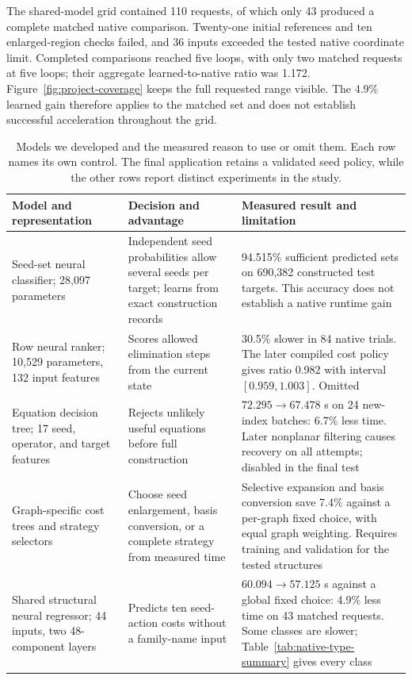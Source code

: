 The shared-model grid contained 110 requests, of which only 43 produced a complete matched native comparison. Twenty-one initial references and ten enlarged-region checks failed, and 36 inputs exceeded the tested native coordinate limit. Completed comparisons reached five loops, with only two matched requests at five loops; their aggregate learned-to-native ratio was 1.172. Figure~\ref{fig:project-coverage} keeps the full requested range visible. The 4.9\% learned gain therefore applies to the matched set and does not establish successful acceleration throughout the grid.

\begin{table}[!htbp]\centering\small
\caption{Models we developed and the measured reason to use or omit them. Each row names its own control. The final application retains a validated seed policy, while the other rows report distinct experiments in the study.}
\label{tab:model-study-summary}
\begin{tabularx}{\linewidth}{@{}>{\raggedright\arraybackslash}p{3.4cm}YY@{}}\toprule
Model and representation & Decision and advantage & Measured result and limitation\\\midrule
Seed-set neural classifier; 28,097 parameters & Independent seed probabilities allow several seeds per target; learns from exact construction records & 94.515\% sufficient predicted sets on 690,382 constructed test targets. This accuracy does not establish a native runtime gain\\
Row neural ranker; 10,529 parameters, 132 input features & Scores allowed elimination steps from the current state & 30.5\% slower in 84 native trials. The later compiled cost policy gives ratio 0.982 with interval $[0.959,1.003]$. Omitted\\
Equation decision tree; 17 seed, operator, and target features & Rejects unlikely useful equations before full construction & $72.295\to67.478$ s on 24 new-index batches: 6.7\% less time. Later nonplanar filtering causes recovery on all attempts; disabled in the final test\\
Graph-specific cost trees and strategy selectors & Choose seed enlargement, basis conversion, or a complete strategy from measured time & Selective expansion and basis conversion save 7.4\% against a per-graph fixed choice, with equal graph weighting. Requires training and validation for the tested structures\\
Shared structural neural regressor; 44 inputs, two 48-component layers & Predicts ten seed-action costs without a family-name input & $60.094\to57.125$ s against a global fixed choice: 4.9\% less time on 43 matched requests. Some classes are slower; Table~\ref{tab:native-type-summary} gives every class\\

\end{tabularx}
\end{table}
